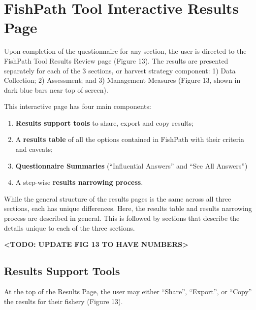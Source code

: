 \documentclass[11pt,]{book}
\providecommand{\tightlist}{%
  \setlength{\itemsep}{0pt}\setlength{\parskip}{0pt}}
\begin{document}
\hypertarget{fishpath-tool-interactive-results-page}{%
\chapter{FishPath Tool Interactive Results
Page}\label{fishpath-tool-interactive-results-page}}

Upon completion of the questionnaire for any section, the user is
directed to the FishPath Tool Results Review page (Figure 13). The
results are presented separately for each of the 3 sections, or harvest
strategy component: 1) Data Collection; 2) Assessment; and 3) Management
Measures (Figure 13, shown in dark blue bars near top of screen).

This interactive page has four main components:

\begin{enumerate}
\def\labelenumi{\arabic{enumi}.}
\tightlist
\item
  \textbf{Results support tools} to share, export and copy results;
\item
  A \textbf{results table} of all the options contained in FishPath with
  their criteria and caveats;
\item
  \textbf{Questionnaire Summaries} (``Influential Answers'' and ``See
  All Answers'')
\item
  A step-wise \textbf{results narrowing process}.
\end{enumerate}

While the general structure of the results pages is the same across all
three sections, each has unique differences. Here, the results table and
results narrowing process are described in general. This is followed by
sections that describe the details unique to each of the three sections.

\textbf{\textless TODO: UPDATE FIG 13 TO HAVE NUMBERS\textgreater{}}

\hypertarget{results-support-tools}{%
\section{Results Support Tools}\label{results-support-tools}}

At the top of the Results Page, the user may either ``Share'',
``Export'', or ``Copy'' the results for their fishery (Figure 13).
\end{document}
